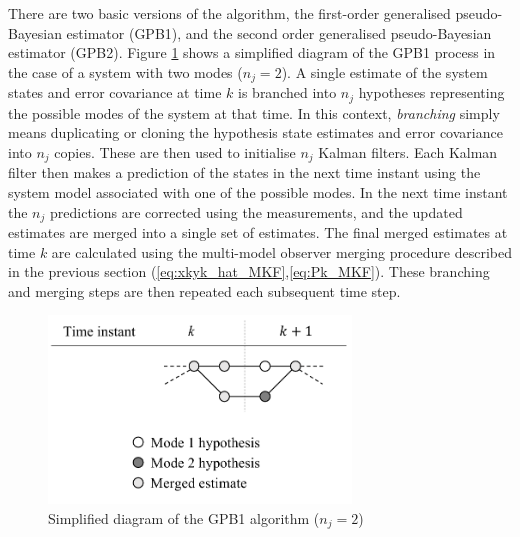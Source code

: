 There are two basic versions of the algorithm, the first-order generalised pseudo-Bayesian estimator (\gls{GPB1}), and the second order generalised pseudo-Bayesian estimator (\gls{GPB2}). Figure \ref{fig:mm-obs-gpb1} shows a simplified diagram of the \gls{GPB1} process in the case of a system with two modes ($n_j=2$). A single estimate of the system states and error covariance at time $k$ is branched into $n_j$ hypotheses representing the possible modes of the system at that time. In this context, \textit{branching} simply means duplicating or cloning the hypothesis state estimates and error covariance into $n_j$ copies. These are then used to initialise $n_j$ Kalman filters. Each Kalman filter then makes a prediction of the states in the next time instant using the system model associated with one of the possible modes. In the next time instant the $n_j$ predictions are corrected using the measurements, and the updated estimates are merged into a single set of estimates. The final merged estimates at time $k$ are calculated using the multi-model observer merging procedure described in the previous section (\ref{eq:xkyk_hat_MKF},\ref{eq:Pk_MKF}). These branching and merging steps are then repeated each subsequent time step.

\begin{figure}[htp]
	\centering
	\includegraphics[height=5cm]{images/mm_obs_seq_gpb1.pdf}
	\caption{Simplified diagram of the \gls{GPB1} algorithm ($n_j=2$)}
	\label{fig:mm-obs-gpb1}
\end{figure}

